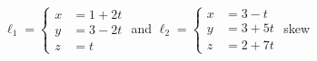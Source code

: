 {$\ell_1 = \left\{\begin{aligned} x&= 1+2t\\ y&= 3-2t\\ z&= t\end{aligned}\right.$ \quad and \quad
$\ell_2 = \left\{\begin{aligned} x&= 3-t\\ y&= 3+5t\\ z&= 2+7t\end{aligned}\right.$
}
{skew
}

